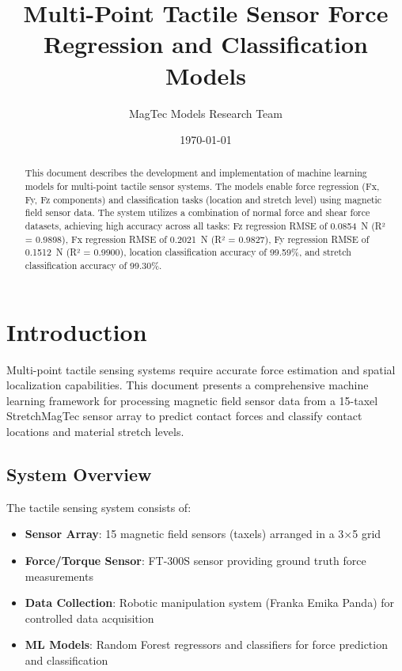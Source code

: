 \documentclass[11pt,a4paper]{article}
\title{Multi-Point Tactile Sensor Force Regression and Classification Models}
\author{MagTec Models Research Team}
\date{\today}
\begin{document}
\maketitle

\begin{abstract}
This document describes the development and implementation of machine learning models for multi-point tactile sensor systems. The models enable force regression (Fx, Fy, Fz components) and classification tasks (location and stretch level) using magnetic field sensor data. The system utilizes a combination of normal force and shear force datasets, achieving high accuracy across all tasks: Fz regression RMSE of \SI{0.0854}{\newton} (R² = 0.9898), Fx regression RMSE of \SI{0.2021}{\newton} (R² = 0.9827), Fy regression RMSE of \SI{0.1512}{\newton} (R² = 0.9900), location classification accuracy of 99.59\%, and stretch classification accuracy of 99.30\%.
\end{abstract}

\tableofcontents
\newpage

\section{Introduction}

Multi-point tactile sensing systems require accurate force estimation and spatial localization capabilities. This document presents a comprehensive machine learning framework for processing magnetic field sensor data from a 15-taxel StretchMagTec sensor array to predict contact forces and classify contact locations and material stretch levels.

\subsection{System Overview}

The tactile sensing system consists of:
\begin{itemize}
    \item \textbf{Sensor Array}: 15 magnetic field sensors (taxels) arranged in a 3×5 grid
    \item \textbf{Force/Torque Sensor}: FT-300S sensor providing ground truth force measurements
    \item \textbf{Data Collection}: Robotic manipulation system (Franka Emika Panda) for controlled data acquisition
    \item \textbf{ML Models}: Random Forest regressors and classifiers for force prediction and classification
\end{itemize}
\end{document}
